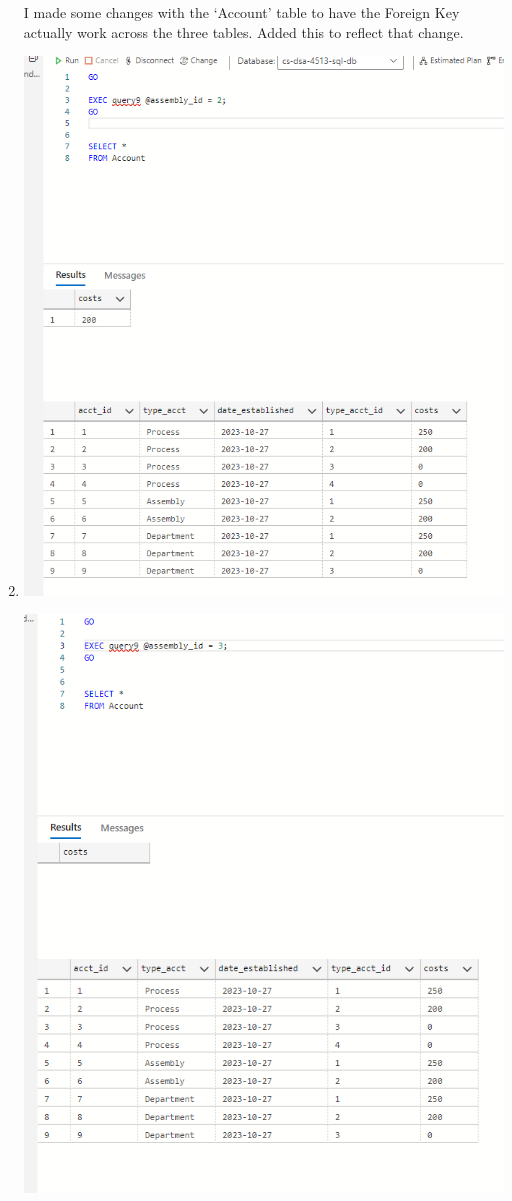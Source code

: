 \documentclass[11pt]{article}
\begin{document}
\begin{enumerate}
I made some changes with the `Account' table to have the Foreign Key actually work across the three tables.  Added this to reflect that change.
\item


\includegraphics[width = \textwidth]{asscost1.png}

\includegraphics[width = \textwidth]{asscost2.png}


\end{enumerate}
\end{document}
